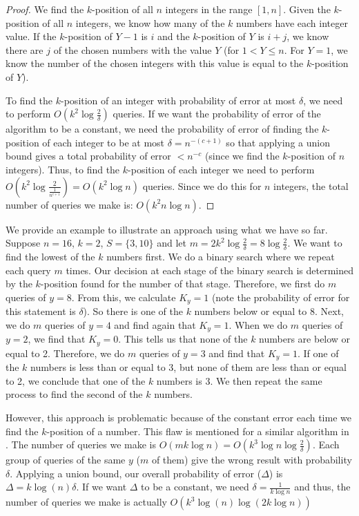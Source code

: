\documentclass[12pt]{article}
\newcommand{\de}{\delta}
\begin{document}
\begin{proof}

We find the $k$-position of all $n$ integers in the range $[1, n]$. Given the $k$-position of all $n$ integers, we know how many of the $k$ numbers have each integer value. If the $k$-position of $Y-1$ is $i$ and the $k$-position of $Y$ is $i+j$, we know there are $j$ of the chosen numbers with the value $Y$ (for $1 < Y \leq n$. For $Y = 1$, we know the number of the chosen integers with this value is equal to the $k$-position of $Y$).

To find the $k$-position of an integer with probability of error at most $\delta$, we need to perform $O(k^2 \log{\frac{2}{\delta}})$ queries. If we want the probability of error of the algorithm to be a constant, we need the probability of error of finding the $k$-position of each integer to be at most $\de=n^{-(c+1)}$ so that applying a union bound gives a total probability of error $<n^{-c}$ (since we find the $k$-position of $n$ integers). Thus, to find the $k$-position of each integer we need to perform $O\left(k^2 \log{\frac{2}{\frac{1}{n^{c+1}}}}\right) = O\left(k^2 \log{n}\right)$ queries. Since we do this for $n$ integers, the total number of queries we make is: ${O(k^2 n \log{n})}$.
\end{proof}

We provide an example to illustrate an approach using what we have so far. Suppose $n = 16$, $k = 2$, $S = \{3, 10\}$ and let $m = 2k^2\log{\frac{2}{\delta}}= 8\log{\frac{2}{\delta}}$. We want to find the lowest of the $k$ numbers first. We do a binary search where we repeat each query $m$ times. Our decision at each stage of the binary search is determined by the $k$-position found for the number of that stage. Therefore, we first do $m$ queries of $y=8$. From this, we calculate $K_y = 1$ (note the probability of error for this statement is $\delta$). So there is one of the $k$ numbers below or equal to 8. Next, we do $m$ queries of $y=4$ and find again that $K_y = 1$. When we do $m$ queries of $y=2$, we find that $K_y = 0$. This tells us that none of the $k$ numbers are below or equal to 2. Therefore, we do $m$ queries of $y=3$ and find that $K_y = 1$. If one of the $k$ numbers is less than or equal to 3, but none of them are less than or equal to 2, we conclude that one of the $k$ numbers is 3. We then repeat the same process to find the second of the $k$ numbers. 

However, this approach is problematic because of the constant error each time we find the $k$-position of a number. This flaw is mentioned for a similar algorithm in \cite{Karp}. The number of queries we make is $O(mk\log{n}) = O\left(k^3\log{n}\log{\frac{2}{\delta}}\right)$. Each group of queries of the same $y$ ($m$ of them) give the wrong result with probability $\delta$. Applying a union bound, our overall probability of error ($\Delta$) is $\Delta = k\log{(n)}\delta$. If we want $\Delta$ to be a constant, we need $\delta = \frac{1}{k\log{n}}$ and thus, the number of queries we make is actually $O\left(k^3\log{(n)}\log{(2k\log{n})}\right)$ 
\end{document}
